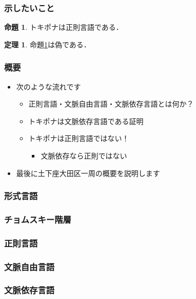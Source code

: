 \documentclass[14pt]{beamer}
\theoremstyle{definition}
\newtheorem{thm}{定理}
\newtheorem{prop}{命題}
\begin{document}
\begin{frame}
	\frametitle{示したいこと}

	\begin{tcolorbox}[
			colframe=orange!80,
			colback=orange!20,
			sharp corners]
		\begin{prop}\label{prop:pona}
			トキポナは正則言語である．
		\end{prop}

		\begin{thm}
			命題\ref{prop:pona}は偽である．
		\end{thm}
	\end{tcolorbox}

\end{frame}


\begin{frame}
	\frametitle{概要}

	\begin{itemize}
		\item 次のような流れです
			\begin{itemize}
				\item 正則言語・文脈自由言語・文脈依存言語とは何か？
				\item トキポナは文脈依存言語である証明
				\item トキポナは正則言語ではない！
					\begin{itemize}
						\item 文脈依存なら正則ではない
					\end{itemize}
			\end{itemize}
		\item 最後に土下座大田区一周の概要を説明します
	\end{itemize}

\end{frame}


\begin{frame}
	\frametitle{形式言語}
\end{frame}


\begin{frame}
	\frametitle{チョムスキー階層}
\end{frame}


\begin{frame}
	\frametitle{正則言語}
\end{frame}


\begin{frame}
	\frametitle{文脈自由言語}
\end{frame}


\begin{frame}
	\frametitle{文脈依存言語}
\end{frame}
\end{document}
